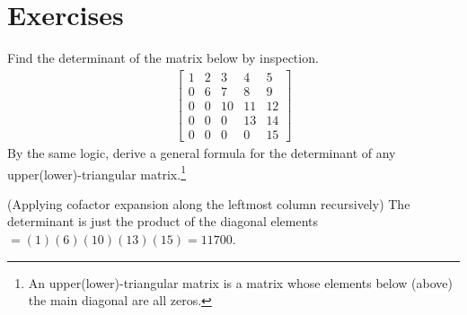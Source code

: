 \section{Exercises}

\begin{Exercise}
Find the determinant of the matrix below by inspection.
\begin{align*}
\begin{bmatrix}
1 & 2 & 3 & 4 & 5 \\
0 & 6 & 7 & 8 & 9 \\
0 & 0 & 10 & 11 & 12 \\
0 & 0 & 0 & 13 & 14 \\
0 & 0 & 0 & 0 & 15
\end{bmatrix}    
\end{align*}
By the same logic, derive a general formula for the determinant of any upper(lower)-triangular matrix.\footnote{An upper(lower)-triangular matrix is a matrix whose elements below (above) the main diagonal are all zeros.}
\end{Exercise}
\begin{Answer}
(Applying cofactor expansion along the leftmost column recursively) The determinant is just the product of the diagonal elements $= (1)(6)(10)(13)(15) = 11700$.    
\end{Answer}

